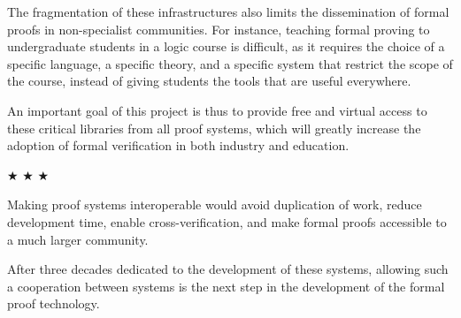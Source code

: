 The fragmentation of these infrastructures also limits the
dissemination of formal proofs in non-specialist communities. For
instance, teaching formal proving to undergraduate students in a logic
course is difficult, as it requires the choice of a specific language,
a specific theory, and a specific system that restrict the scope of the
course, instead of giving students the tools that are useful
everywhere. 

An important goal of this project is thus to provide free and virtual
access to these critical libraries from all proof systems,
which will greatly increase the adoption of formal verification in
both industry and education.


\begin{center}
$\bigstar$ $\bigstar$ $\bigstar$
\end{center}

Making proof systems interoperable would avoid duplication of work,
reduce development time, enable cross-verification, and make formal
proofs accessible to a much larger community.  

After three decades
dedicated to the development of these systems, allowing such a
cooperation between systems is the next step in the development of the
formal proof technology.

\medskip

